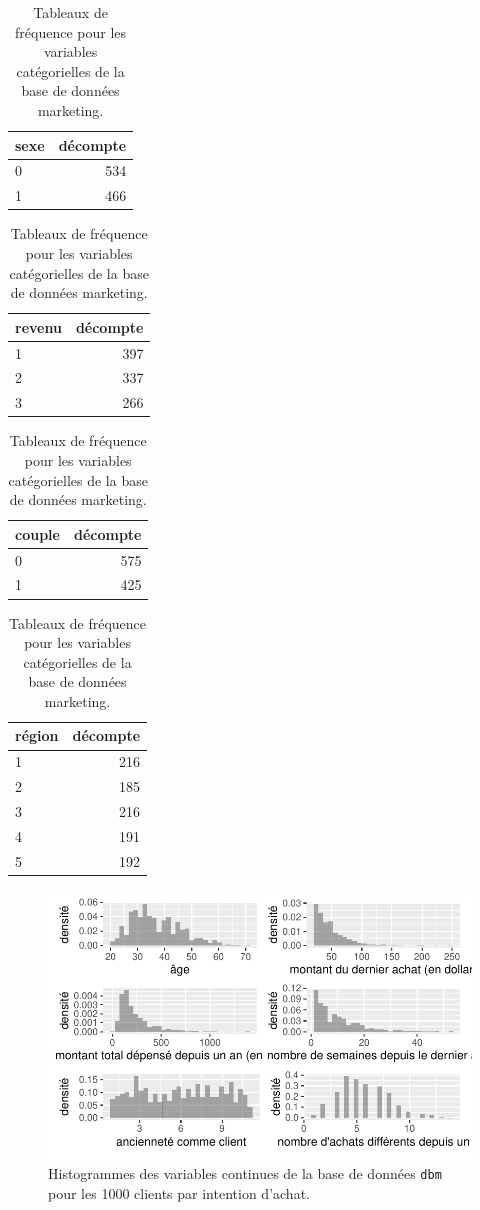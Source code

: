 \documentclass[
  11pt,
  letterpaper,
]{scrbook}
\theoremstyle{definition}
\theoremstyle{remark}
\begin{document}
\hypertarget{tbl-contingence-dbm}{}
\begin{table}
\caption{\label{tbl-contingence-dbm}Tableaux de fréquence pour les variables catégorielles de la base de
données marketing. }\tabularnewline


\begin{tabular}{lr}
\toprule
sexe & décompte\\
\midrule
0 & 534\\
1 & 466\\
\bottomrule
\end{tabular}
\begin{tabular}{lr}
\toprule
revenu & décompte\\
\midrule
1 & 397\\
2 & 337\\
3 & 266\\
\bottomrule
\end{tabular}
\begin{tabular}{lr}
\toprule
couple & décompte\\
\midrule
0 & 575\\
1 & 425\\
\bottomrule
\end{tabular}
\begin{tabular}{lr}
\toprule
région & décompte\\
\midrule
1 & 216\\
2 & 185\\
3 & 216\\
4 & 191\\
5 & 192\\
\bottomrule
\end{tabular}
\end{table}

\begin{figure}[ht!]

{\centering \includegraphics[width=1\textwidth,height=\textheight]{./04-selectionmodeles_files/figure-pdf/fig-histogrammes-eda-dbm-1.pdf}

}

\caption{\label{fig-histogrammes-eda-dbm}Histogrammes des variables
continues de la base de données \texttt{dbm} pour les 1000 clients par
intention d'achat.}

\end{figure}
\end{document}
